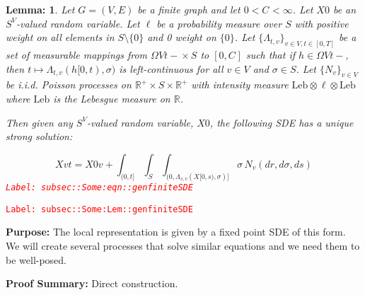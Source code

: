 \documentclass[12pt]{article}
\newcommand{\mb}{\mathbb}
\newcommand{\te}{\text}
\newcommand{\tr}{\textcolor{red}}
\newcommand{\labe}[1]{\tr{\texttt{Label: #1}}}
\newcommand{\purpose}{\textbf{Purpose: }}
\newcommand{\pfsum}{\textbf{Proof Summary: }}
\newcommand{\ind}{\hspace{24pt}}
\renewcommand{\v}{v}							%
\renewcommand{\S}{S}							%
\newcommand{\s}{\sigma}							%
\newcommand{\T}{T}								%
\renewcommand{\t}{t}							%
\renewcommand{\tt}{s}							%
\newcommand{\X}{X}								%
\newcommand{\poiss}[1]{N_{#1}}						%
\newcommand{\leb}{\te{Leb}}							%
\renewcommand{\G}{G}								%
\newcommand{\V}{V}									%
\newcommand{\E}{E}									%
\renewcommand{\r}{r}								%
\newcommand{\ratee}[1]{\Lambda_{#1}}				%
\newcommand{\const}[1]{C_{#1}}						%
\newcommand{\Sm}{\ell}								%
\newtheorem{lem}[thms]{Lemma: }
\begin{document}
\begin{lem}
Let \(\G = (\V,\E)\) be a finite graph and let \(0 < \const{}< \infty\). Let \(\X{}{0}\) be an \(\S^\V\)-valued random variable. Let \(\Sm\) be a probability measure over \(\S\) with positive weight on all elements in \(S\setminus\{0\}\) and 0 weight on \(\{0\}\). Let \(\{\ratee{\t,\v}\}_{\v \in \V,\t\in [0,\T]}\) be a set of measurable mappings from \(\Omega{\V}{\t-} \times \S\) to \([0,\const{}]\) such that if \(h \in \Omega{\V}{\t-}\), then \(\t\mapsto \ratee{\t,\v}(h[0,\t),\s)\) is left-continuous for all \(\v \in \V\) and \(\s \in \S\). Let \(\{\poiss{\v}\}_{\v \in \V}\) be i.i.d. Poisson processes on \(\mb{R}^+\times \S\times\mb{R}^+\) with intensity measure \(\leb\otimes\Sm\otimes\leb\) where \(\leb\) is the Lebesgue measure on \(\mb{R}\).

\ind Then given any \(\S^\V\)-valued random variable, \(\X{}{0}\), the following SDE has a unique strong solution:

\begin{equation}
\X{\v}{\t} = \X{0}{\v} + \int_{(0,\t]}\int_\S\int_{(0,\ratee{\tt,\v}(\X{}{[0,\tt)},\s)]}  \s\,\poiss{\v}(d\r,d\s,d\tt)
\label{subsec::Some:eqn::genfiniteSDE}
\end{equation}
\labe{subsec::Some:eqn::genfiniteSDE}
\label{subsec::Some:Lem::genfiniteSDE}
\end{lem}
\labe{subsec::Some:Lem::genfiniteSDE}

\purpose The local representation is given by a fixed point SDE of this form. We will create several processes that solve similar equations and we need them to be well-posed.

\pfsum Direct construction.
\end{document}
